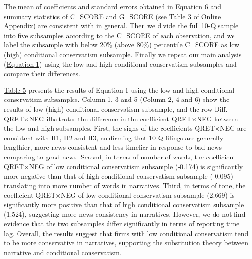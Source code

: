 \documentclass[a4paper]{article}
\begin{document}
\begin{spacing}{2}
The mean of coefficients and standard errors obtained in Equation 6 and summary statistics of C\_SCORE and G\_SCORE (see \hyperref[oat3]{Table 3 of Online Appendix}) are consistent with  in general. Then we divide the full 10-Q sample into five subsamples according to the C\_SCORE of each observation, and we label the subsample with below 20\% (above 80\%) percentile C\_SCORE as low (high) conditional conservatism subsample. Finally we repeat our main analysis (\hyperref[eq1]{Equation 1}) using the low and high conditional conservatism subsamples and compare their differences. 

\hyperref[T5]{Table 5} presents the results of Equation 1 using the low and high conditional conservatism subsamples. Column 1, 3 and 5 (Column 2, 4 and 6) show the results of low (high) conditional conservatism subsample, and the row Diff. QRET$\times$NEG illustrates the difference in the coefficient QRET$\times$NEG between the low and high subsamples. First, the signs of the coefficients QRET$\times$NEG are consistent with H1, H2 and H3, confirming that 10-Q filings are generally lengthier, more news-consistent and less timelier in response to bad news comparing to good news. Second, in terms of number of words, the coefficient QRET$\times$NEG of low conditional conservatism subsample (-0.174) is significantly more negative than that of high conditional conservatism subsample (-0.095), translating into more number of words in narratives. Third, in terms of tone, the coefficient QRET$\times$NEG of low conditional conservatism subsample (2.669) is significantly more positive than that of high conditional conservatism subsample (1.524), suggesting more news-consistency in narratives. However, we do not find evidence that the two subsamples differ significantly in terms of reporting time lag. Overall, the results suggest that firms with low conditional conservatism tend to be more conservative in narratives, supporting the substitution theory between narrative and conditional conservatism.


\end{spacing}
\end{document}
